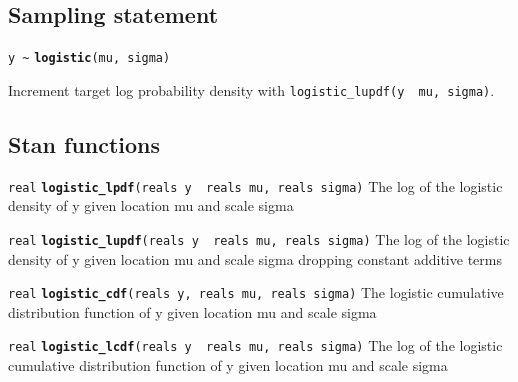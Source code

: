 \documentclass[
  10pt,
]{book}
\begin{document}
\hypertarget{sampling-statement-30}{%
\subsection{Sampling statement}\label{sampling-statement-30}}

\texttt{y\ \textasciitilde{}} \textbf{\texttt{logistic}}\texttt{(mu,\ sigma)}

Increment target log probability density with \texttt{logistic\_lupdf(y\ \textbar{}\ mu,\ sigma)}.

\hypertarget{stan-functions-29}{%
\subsection{Stan functions}\label{stan-functions-29}}


\texttt{real} \textbf{\texttt{logistic\_lpdf}}\texttt{(reals\ y\ \textbar{}\ reals\ mu,\ reals\ sigma)}\newline
The log of the logistic density of y given location mu and scale sigma


\texttt{real} \textbf{\texttt{logistic\_lupdf}}\texttt{(reals\ y\ \textbar{}\ reals\ mu,\ reals\ sigma)}\newline
The log of the logistic density of y given location mu and scale sigma
dropping constant additive terms


\texttt{real} \textbf{\texttt{logistic\_cdf}}\texttt{(reals\ y,\ reals\ mu,\ reals\ sigma)}\newline
The logistic cumulative distribution function of y given location mu
and scale sigma


\texttt{real} \textbf{\texttt{logistic\_lcdf}}\texttt{(reals\ y\ \textbar{}\ reals\ mu,\ reals\ sigma)}\newline
The log of the logistic cumulative distribution function of y given
location mu and scale sigma
\end{document}
